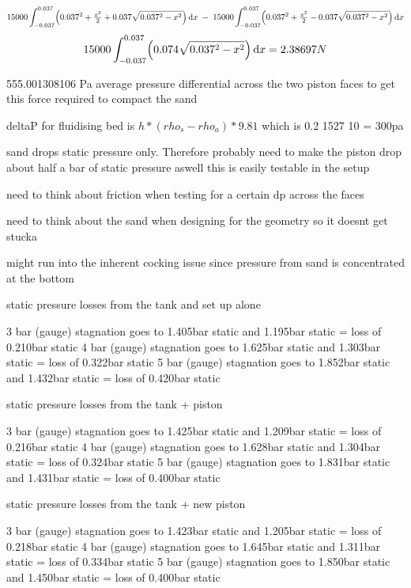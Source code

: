 \begin{equation}
    15000\int_{-0.037}^{0.037}\Bigl(0.037^2 + \tfrac{x^2}{2} + 0.037\sqrt{0.037^2 - x^2}\Bigr)\,\mathrm{d}x
    \;-\;
    15000\int_{-0.037}^{0.037}\Bigl(0.037^2 + \tfrac{x^2}{2} - 0.037\sqrt{0.037^2 - x^2}\Bigr)\,\mathrm{d}x
\end{equation}
\begin{equation}
    15000\int_{-0.037}^{0.037}\Bigl(0.074\sqrt{0.037^2 - x^2}\Bigr)\,\mathrm{d}x = 2.38697N
\end{equation}

555.001308106 Pa average pressure differential across the two piston faces to get this force required to compact the sand

deltaP for fluidising bed is $h*(rho_s - rho_a)*9.81$ which is 0.2 1527 10 = 300pa


sand drops static pressure only. Therefore probably need to make the piston drop about half a bar of static pressure aswell
this is easily testable in the setup

need to think about friction when testing for a certain dp across the faces

need to think about the sand when designing for the geometry so it doesnt get stucka

might run into the inherent cocking issue since pressure from sand is concentrated at the bottom

static pressure losses from the tank and set up alone

3 bar (gauge) stagnation goes to 1.405bar static and 1.195bar static = loss of 0.210bar static
4 bar (gauge) stagnation goes to 1.625bar static and 1.303bar static = loss of 0.322bar static
5 bar (gauge) stagnation goes to 1.852bar static and 1.432bar static = loss of 0.420bar static

static pressure losses from the tank + piston

3 bar (gauge) stagnation goes to 1.425bar static and 1.209bar static = loss of 0.216bar static
4 bar (gauge) stagnation goes to 1.628bar static and 1.304bar static = loss of 0.324bar static
5 bar (gauge) stagnation goes to 1.831bar static and 1.431bar static = loss of 0.400bar static

static pressure losses from the tank + new piston

3 bar (gauge) stagnation goes to 1.423bar static and 1.205bar static = loss of 0.218bar static
4 bar (gauge) stagnation goes to 1.645bar static and 1.311bar static = loss of 0.334bar static
5 bar (gauge) stagnation goes to 1.850bar static and 1.450bar static = loss of 0.400bar static


